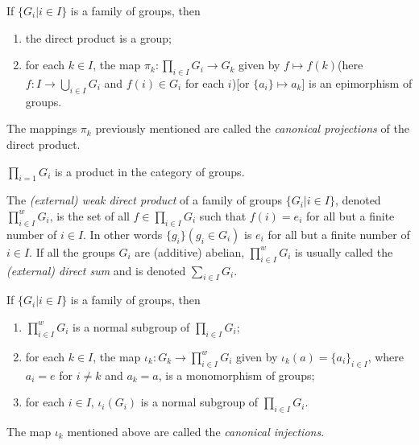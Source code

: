 \begin{theorem}
	If $ \{G_i | i \in I \} $ is a family of groups, then
	\begin{enumerate}
		\item the direct product is a group;
		\item for each $ k \in I $, the map $ \pi_k:\prod_{i\in I} G_i \to G_k $ given by $ f \mapsto f(k) $(here $ f: I \to \bigcup_{i \in I}G_i $ and $ f(i)\in G_i $ for each $ i $)[or $ \{a_i \}\mapsto a_k $] is an epimorphism of groups.
	\end{enumerate}
\end{theorem}
\begin{definition}
	The mappings $ \pi_k $ previously mentioned are called the \textit{canonical projections} of the direct product.
\end{definition}
\begin{theorem}
	$ \prod_{i=1} G_i $ is a product in the category of groups.
\end{theorem}
\begin{definition}
	The \textit{(external) weak direct product} of a family of groups $ \{G_i | i\in I \} $, denoted $ \prod_{i \in I}^{w}G_i $, is the set of all $ f \in \prod_{i \in I}G_i $ such that $ f(i)=e_i $ for all but a finite number of $ i \in I $. In other words $ \{g_ i\} (g_i \in G_i)$ is $ e_i $ for all but a finite number of $ i \in I $. If all the groups $ G_i $ are (additive) abelian, $ \prod_{i \in I}^{w}G_i $ is usually called the \textit{(external) direct sum} and is denoted $ \sum_{i \in I}G_i $.
\end{definition}
\begin{theorem}
	If $ \{G_i | i \in I \} $ is a family of groups, then
	\begin{enumerate}
		\item $ \prod_{i \in I}^{w}G_i $ is a normal subgroup of $ \prod_{i \in I} G_i $;
		\item for each $ k \in I $, the map $ \iota_k:G_k \to \prod_{i \in I}^{w}G_i  $ given by $ \iota_k(a)=\{a_i \}_{i \in I} $, where $ a_i=e $ for $ i \neq k $ and $ a_k = a $, is a monomorphism of groups;
		\item for each $ i \in I $, $ \iota_i(G_i) $ is a normal subgroup of $ \prod_{i \in I} G_i $.
	\end{enumerate}
\end{theorem}
\begin{definition}
	The map $ \iota_k $ mentioned above are called the \textit{canonical injections}.
\end{definition}
